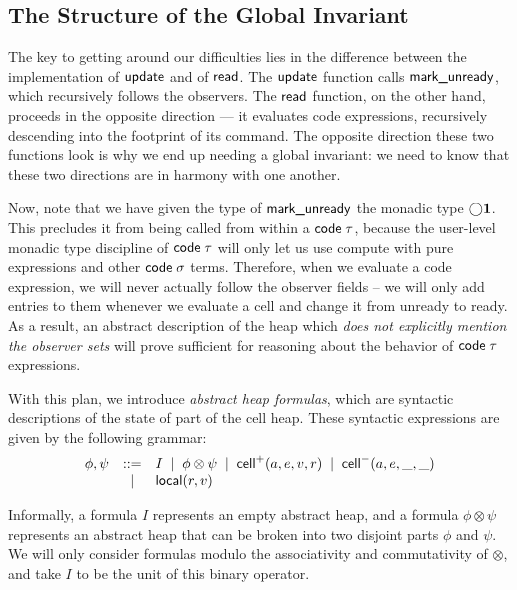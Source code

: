 \documentclass[natbib]{sigplanconf}
\begin{document}
\subsection{The Structure of the Global Invariant}

The key to getting around our difficulties lies in the difference
between the implementation of $\mbox{\textsf{{update}}}$ and of $\mbox{\textsf{{read}}}$.
The $\mbox{\textsf{{update}}}$ function calls $\mbox{\textsf{{mark\_unready}}}$, which 
recursively follows the observers. The $\mbox{\textsf{{read}}}$ function, on the 
other hand, proceeds in the opposite direction --- it evaluates code expressions,
recursively descending into the footprint of its command. The opposite
direction these two functions look is why we end up needing a global
invariant: we need to know that these two directions are in harmony
with one another.

Now, note that we have given the type of $\mbox{\textsf{{mark\_unready}}}$ the
monadic type $\bigcirc{\mathbf{1}}$. This precludes it from being called
from within a $\mbox{\textsf{{code}}}\;{\tau}$, because the user-level monadic type 
discipline of $\mbox{\textsf{{code}}}\;{\tau}$ will only let us use compute with pure 
expressions and other $\mbox{\textsf{{code}}}\;{\sigma}$ terms. 
Therefore, when we evaluate a code expression, we will never actually
follow the observer fields -- we will only add entries to them
whenever we evaluate a cell and change it from unready to ready.  As a
result, an abstract description of the heap which \emph{does not
  explicitly mention the observer sets} will prove sufficient for
reasoning about the behavior of $\mbox{\textsf{{code}}}\;{\tau}$ expressions. 

With this plan, we introduce \emph{abstract heap formulas}, which are
syntactic descriptions of the state of part of the cell heap. These
syntactic expressions are given by the following grammar:
\begin{displaymath}
  \begin{array}{lcl}
    \phi,\psi & ::= & I \;\;|\;\; \phi \otimes \psi \;\;|\;\; \mbox{\textsf{{cell}}}^{+}({a}, {e}, {v}, {r}) \;\;|\;\; \mbox{\textsf{{cell}}}^{-}({a}, {e}, {\_}, {\_})\\
         &  |  & \mbox{\textsf{{local}}}({r}, {v}) 
  \end{array}
\end{displaymath}

Informally, a formula $I$ represents an empty abstract heap, and a
formula $\phi \otimes \psi$ represents an abstract heap that can be
broken into two disjoint parts $\phi$ and $\psi$. We will only
consider formulas modulo the associativity and commutativity of
$\otimes$, and take $I$ to be the unit of this binary operator.
\end{document}
